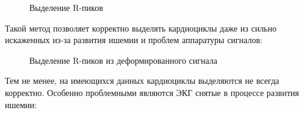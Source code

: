 \documentclass[a4paper,12pt]{extarticle}
\begin{document}
\begin{figure}[H]
  \noindent{}
  \caption{Выделение R-пиков}
\end{figure}

Такой метод позволяет корректно выделять кардиоциклы даже из сильно искаженных из-за развития ишемии и проблем аппаратуры сигналов:

\begin{figure}[H]
  \noindent{}
  \caption{Выделение R-пиков из деформированного сигнала}
\end{figure}

Тем не менее, на имеющихся данных кардиоциклы выделяются не всегда корректно. Особенно проблемными являются ЭКГ снятые в процессе развития ишемии:
\end{document}

